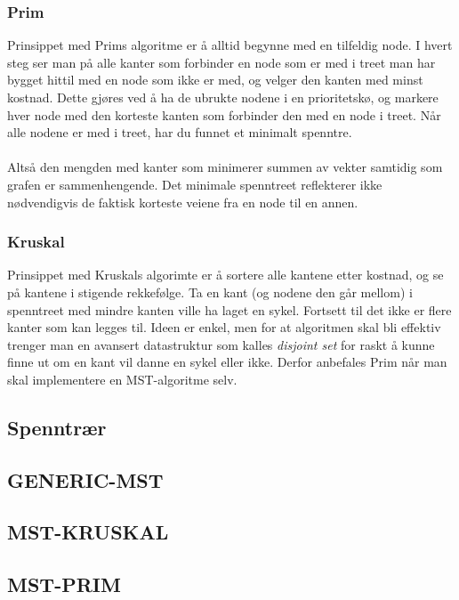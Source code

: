 \subsubsection{Prim}
Prinsippet med Prims algoritme er å alltid begynne med en tilfeldig node. I hvert steg ser man på alle kanter som forbinder en node som er med i treet man har bygget hittil med en node som ikke er med, og velger den kanten med minst kostnad. Dette gjøres ved å ha de ubrukte nodene i en prioritetskø, og markere hver node med den korteste kanten som forbinder den med en node i treet. Når alle nodene er med i treet, har du funnet et minimalt spenntre.
\\\\
Altså den mengden med kanter som minimerer summen av vekter samtidig som grafen er sammenhengende. Det minimale spenntreet reflekterer ikke nødvendigvis de faktisk korteste veiene fra en node til en annen.

\subsubsection{Kruskal}
Prinsippet med Kruskals algorimte er å sortere alle kantene etter kostnad, og se på kantene i stigende rekkefølge. Ta en kant (og nodene den går mellom) i spenntreet med mindre kanten ville ha laget en sykel. Fortsett til det ikke er flere kanter som kan legges til. Ideen er enkel, men for at algoritmen skal bli effektiv trenger man en avansert datastruktur som kalles \textit{disjoint set} for raskt å kunne finne ut om en kant vil danne en sykel eller ikke. Derfor anbefales Prim når man skal implementere en MST-algoritme selv.

\subsection{Spenntrær}
\subsection{GENERIC-MST}
\subsection{MST-KRUSKAL}
\subsection{MST-PRIM}